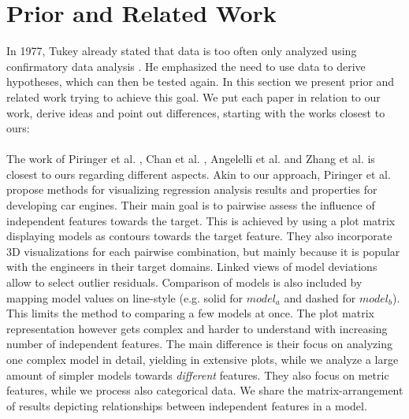 \documentclass[journal]{style/vgtc} 			          %
\begin{document}
\section{Prior and Related Work}
In 1977, Tukey already stated that data is too often only analyzed using confirmatory data analysis \cite{Tukey}.
He emphasized the need to use data to derive hypotheses, which can then be tested again.
In this section we present prior and related work trying to achieve this goal.
We put each paper in relation to our work, derive ideas and point out differences, starting with the works closest to ours:
\\\\
The work of Piringer et al. \cite{Piringer}, Chan et al. \cite{Chan}, Angelelli et al. \cite{Angelelli} and Zhang et al. \cite{Zhang2014} is closest to ours regarding different aspects.
Akin to our approach, Piringer et al. \cite{Piringer} propose methods for visualizing regression analysis results and properties for developing car engines.
Their main goal is to pairwise assess the influence of independent features towards the target.
This is achieved by using a plot matrix displaying models as contours towards the target feature.
They also incorporate 3D visualizations for each pairwise combination, but mainly because it is popular with the engineers in their target domains.
Linked views of model deviations allow to select outlier residuals.
Comparison of models is also included by mapping model values on line-style (e.g. solid for $model_a$ and dashed for $model_b$).
This limits the method to comparing a few models at once.
The plot matrix representation however gets complex and harder to understand with increasing number of independent features.
The main difference is their focus on analyzing one complex model in detail, yielding in extensive plots, while we analyze a large amount of simpler models towards \emph{different} features.
They also focus on metric features, while we process also categorical data.
We share the matrix-arrangement of results depicting relationships between independent features in a model.
\end{document}
